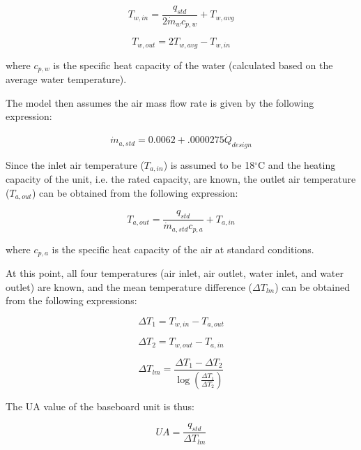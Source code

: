\begin{equation}
{T_{w,in}} = \frac{{{q_{std}}}}{{2\dot m{}_w{c_{p,w}}}} + {T_{w,avg}}
\end{equation}

\begin{equation}
{T_{w,out}} = 2{T_{w,avg}} - {T_{w,in}}
\end{equation}

where \({c_{p,w}}\) is the specific heat capacity of the water (calculated based on the average water temperature).

The model then assumes the air mass flow rate is given by the following expression:

\begin{equation}
\dot{m}_{a,std} = 0.0062 + .0000275 \dot{Q}_{design}
\end{equation}

Since the inlet air temperature (\({T_{a,in}}\)) is assumed to be 18\(^{\circ}\)C and the heating capacity of the unit, i.e. the rated capacity, are known, the outlet air temperature (\({T_{a,out}}\)) can be obtained from the following expression:

\begin{equation}
T_{a,out} = \frac{q_{std}}{\dot{m}_{a,std}c_{p,a}} + T_{a,in}
\end{equation}

where \({c_{p,a}}\) is the specific heat capacity of the air at standard conditions.

At this point, all four temperatures (air inlet, air outlet, water inlet, and water outlet) are known, and the mean temperature difference (\(\Delta {T_{lm}}\)) can be obtained from the following expressions:

\begin{equation}
\Delta {T_1} = {T_{w,in}} - {T_{a,out}}
\end{equation}

\begin{equation}
\Delta {T_2} = {T_{w,out}} - {T_{a,in}}
\end{equation}

\begin{equation}
\Delta {T_{lm}} = \frac{{\Delta {T_1} - \Delta {T_2}}}{{\log \left( {\frac{{\Delta {T_1}}}{{\Delta {T_2}}}} \right)}}
\end{equation}

The UA value of the baseboard unit is thus:

\begin{equation}
UA = \frac{{{q_{std}}}}{{\Delta {T_{lm}}}}
\end{equation}

